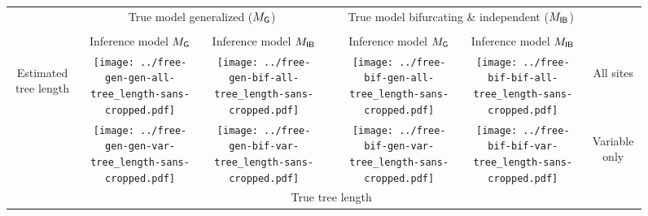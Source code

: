 \documentclass[border=10pt,varwidth=30cm]{standalone}
\newcommand{\genmodel}{\ensuremath{M_{\textrm{\sffamily G}}}\xspace}
\newcommand{\bimodel}{\ensuremath{M_{\textrm{\sffamily IB}}}\xspace}
\begin{document}
\begin{figure}
    \setlength\arrayrulewidth{2pt}
    \centering
    \begin{tabular}{@{}ccccccc@{}}
        & \multicolumn{2}{c}{\LARGE True model generalized (\genmodel)}
        &
        & \multicolumn{2}{c}{\LARGE True model bifurcating \& independent (\bimodel)}
        & \\[1ex]
        \cline{2-3}\cline{5-6}
        & & & & & & \\
        & \multirow{1}{0.19\textwidth}{\centering\Large Inference model \genmodel}
        & \multirow{1}{0.19\textwidth}{\centering\Large Inference model \bimodel}
        &
        & \multirow{1}{0.19\textwidth}{\centering\Large Inference model \genmodel}
        & \multirow{1}{0.19\textwidth}{\centering\Large Inference model \bimodel}
        & \\[4ex]
        \multirow{2}{*}[5em]{\begin{sideways}\Large Estimated tree length\end{sideways}}
        & \texttt{[image: ../free-gen-gen-all-tree\_length-sans-cropped.pdf]}
        & \texttt{[image: ../free-gen-bif-all-tree\_length-sans-cropped.pdf]}
        &
        & \texttt{[image: ../free-bif-gen-all-tree\_length-sans-cropped.pdf]}
        & \texttt{[image: ../free-bif-bif-all-tree\_length-sans-cropped.pdf]}
        & \multirow{1}{*}[9em]{\begin{sideways}\Large All sites\end{sideways}} \\
        & \texttt{[image: ../free-gen-gen-var-tree\_length-sans-cropped.pdf]}
        & \texttt{[image: ../free-gen-bif-var-tree\_length-sans-cropped.pdf]}
        &
        & \texttt{[image: ../free-bif-gen-var-tree\_length-sans-cropped.pdf]}
        & \texttt{[image: ../free-bif-bif-var-tree\_length-sans-cropped.pdf]}
        & \multirow{1}{*}[10em]{\begin{sideways}\Large Variable only\end{sideways}} \\
        & \multicolumn{5}{c}{\Large True tree length} & \\
    \end{tabular}
\end{figure}
\end{document}
